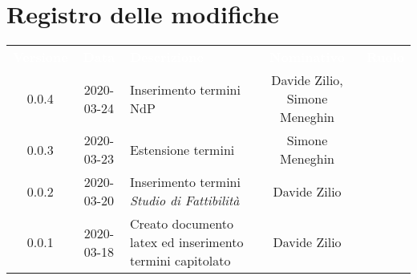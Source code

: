 
\section*{Registro delle modifiche}
{
	\renewcommand{\arraystretch}{1.5}
	\centering
	\begin{longtable}{ c c  C{4cm}  c  c }
		
		\textcolor{white}{\textbf{Versione}} & \textcolor{white}{\textbf{Data}} & \textcolor{white}{\textbf{Descrizione}} & \textcolor{white}{\textbf{Nominativo}} & \textcolor{white}{\textbf{Ruolo}}\\
		0.0.4 & 2020-03-24 & Inserimento termini NdP & Davide Zilio, Simone Meneghin &\reda{}\\
		
		0.0.3 & 2020-03-23 & Estensione termini & Simone Meneghin & \reda{}\\
		
		0.0.2 & 2020-03-20 & Inserimento termini \textit{Studio di Fattibilità}& Davide Zilio &\reda{}\\
		
		0.0.1 & 2020-03-18 & Creato documento latex ed inserimento termini capitolato & Davide Zilio &\reda{}\\		
		
	\end{longtable}

}